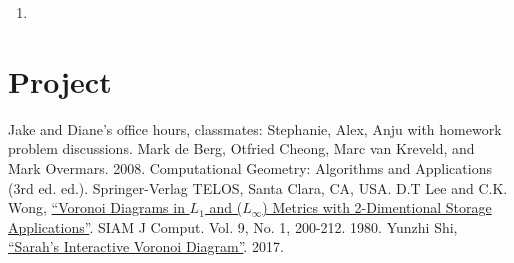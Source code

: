 \documentclass [12pt]{article}
\begin{document}
    \begin{enumerate}[label=\alph*.]
        \item 
    \end{enumerate}





    \section{Project}
    \label{sec:four}
    
        




    




\begin{thebibliography}{1}
    Jake and Diane's office hours, classmates: Stephanie, Alex, Anju with homework problem discussions.
    Mark de Berg, Otfried Cheong, Marc van Kreveld, and Mark Overmars. 2008. Computational Geometry: Algorithms and Applications (3rd ed. ed.). Springer-Verlag TELOS, Santa Clara, CA, USA.
    D.T Lee and C.K. Wong, \href{https://epubs.siam.org/doi/epdf/10.1137/0209017}{``Voronoi Diagrams in $L_1$ and ($L_{\infty}$) Metrics with 2-Dimentional Storage Applications''}. SIAM J Comput. Vol. 9, No. 1, 200-212. 1980.
    Yunzhi Shi, \href{http://yunzhishi.github.io/voronoi.html}{``Sarah's Interactive Voronoi Diagram''}. 2017.
\end{thebibliography}
\end{document}
